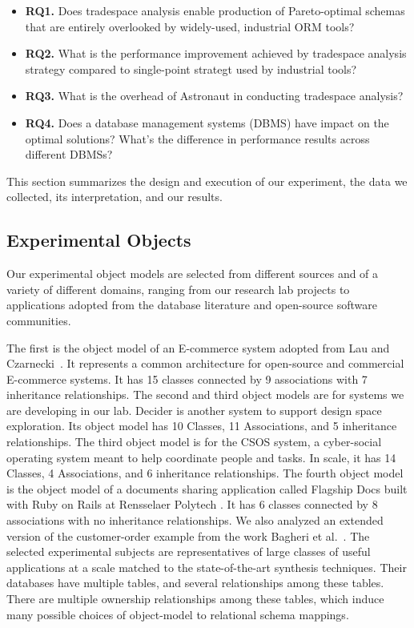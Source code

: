 \documentclass[10pt,conference]{IEEEtran}
\begin{document}
\begin{itemize}
\item \textbf{RQ1.} Does tradespace analysis enable production of Pareto-optimal schemas that are entirely overlooked by widely-used, industrial ORM tools? 
\item \textbf{RQ2.} What is the performance improvement achieved by tradespace analysis strategy compared to single-point strategt used by industrial tools? 
\item \textbf{RQ3.} What is the overhead of Astronaut in conducting tradespace analysis?
\item \textbf{RQ4.} Does a database management systems (DBMS) have impact on the optimal solutions? What's the difference in performance results across different DBMSs?
\end{itemize}

This section summarizes the design and execution of our experiment, the data we collected, its interpretation, and our results.


\subsection{Experimental Objects}

Our experimental object models are selected from different sources and of a variety of different domains, ranging from our research lab projects to applications adopted from the database literature and open-source software communities. 

The first is the object model of an E-commerce system adopted from Lau and Czarnecki~\cite{sean_quan_lau_domain_2006}. It represents a common architecture for open-source and commercial E-commerce systems. It has 15 classes connected by 9 associations with 7 inheritance relationships. The second and third object models are for systems we are developing in our lab. Decider is another system to support design space exploration. Its object model has 10 Classes, 11 Associations, and 5 inheritance relationships. The third object model is for the CSOS system, a  cyber-social operating system meant to help coordinate people and tasks. In scale, it has 14 Classes, 4 Associations, and 6 inheritance relationships. The fourth object model is the object model of a documents sharing application called Flagship Docs built with Ruby on Rails at Rensselaer Polytech \cite{FlagshipDocs4}. It has 6 classes connected by 8 associations with no inheritance relationships. We also analyzed an extended version of the customer-order example from the work Bagheri et al.~\cite{trademaker}. The selected experimental subjects are representatives of large classes of useful applications at a scale matched to the state-of-the-art synthesis techniques. Their databases have multiple tables, and several relationships among these tables. There are multiple ownership relationships among these tables, which induce many possible choices of object-model to relational schema mappings.
\end{document}
